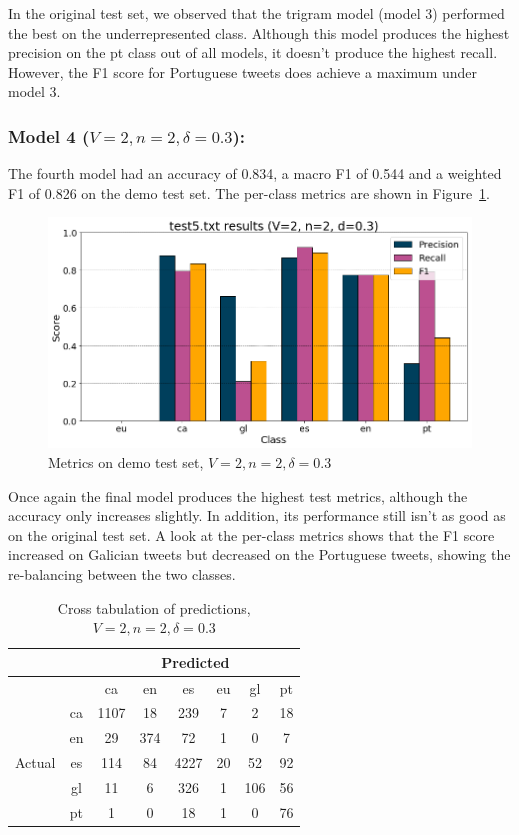 \documentclass[runningheads]{llncs}
\begin{document}
In the original test set, we observed that the trigram model (model 3) performed the best on the underrepresented class. Although this model produces the highest precision on the pt class out of all models, it doesn't produce the highest recall. However, the F1 score for Portuguese tweets does achieve a maximum under model 3.

\subsubsection{Model 4 ($V=2, n=2, \delta=0.3$): }
The fourth model had an accuracy of 0.834, a macro F1 of 0.544 and a weighted F1 of 0.826 on the demo test set. The per-class metrics are shown in Figure~\ref{fig:demo_2_2_0.3}.

\begin{figure}
    \begin{center}
        \includegraphics[width=12.5cm]{images/test5_results_2_2_0.3.png}
        \caption{Metrics on demo test set, $V=2, n=2, \delta=0.3$}
        \label{fig:demo_2_2_0.3}
    \end{center}
\end{figure}

Once again the final model produces the highest test metrics, although the accuracy only increases slightly. In addition, its performance still isn't as good as on the original test set. A look at the per-class metrics shows that the F1 score increased on Galician tweets but decreased on the Portuguese tweets, showing the re-balancing between the two classes. 

\begin{table}
	\centering
	\caption{Cross tabulation of predictions, $V=2, n=2, \delta=0.3$}
	\label{tab:demo_confusion_2_2_0.3}
	\begin{tabular}{|c|c|c|c|c|c|c|c|} \hline
	    & & \multicolumn{6}{c|}{Predicted} \\ \hline
		& &    ca &   en &    es &  eu &   gl &  pt \\ \hline
		\multirow{6}{*}{Actual} & ca   &  1107 &   18 &   239 &   7 &    2 &  18 \\
		& en   &    29 &  374 &    72 &   1 &    0 &   7 \\
		& es   &   114 &   84 &  4227 &  20 &   52 &  92 \\
		& gl   &    11 &    6 &   326 &   1 &  106 &  56 \\
		& pt   &     1 &    0 &    18 &   1 &    0 &  76 \\ \hline
	\end{tabular}
\end{table}
\end{document}
